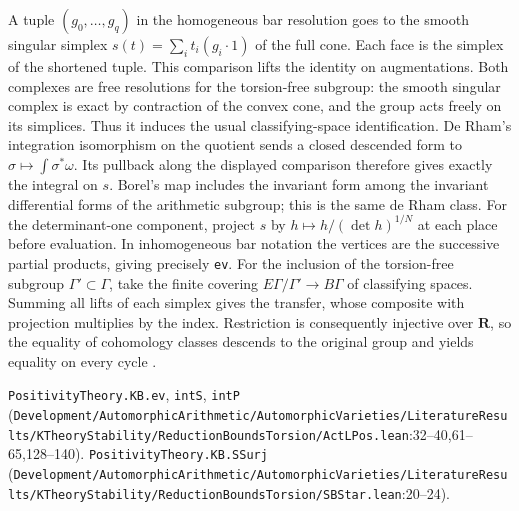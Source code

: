 A tuple $(g_0,\ldots,g_q)$ in the homogeneous bar resolution goes to the smooth singular simplex $s(t)=\sum_i t_i(g_i\cdot1)$ of the full cone. Each face is the simplex of the shortened tuple. This comparison lifts the identity on augmentations. Both complexes are free resolutions for the torsion-free subgroup: the smooth singular complex is exact by contraction of the convex cone, and the group acts freely on its simplices. Thus it induces the usual classifying-space identification. De Rham's integration isomorphism on the quotient sends a closed descended form to $\sigma\mapsto\int\sigma^*\omega$. Its pullback along the displayed comparison therefore gives exactly the integral on $s$. Borel's map includes the invariant form among the invariant differential forms of the arithmetic subgroup; this is the same de Rham class. For the determinant-one component, project $s$ by $h\mapsto h/(\det h)^{1/N}$ at each place before evaluation. In inhomogeneous bar notation the vertices are the successive partial products, giving precisely \nolinkurl{ev}. For the inclusion of the torsion-free subgroup $\Gamma'\subset\Gamma$, take the finite covering $E\Gamma/\Gamma'\to B\Gamma$ of classifying spaces. Summing all lifts of each simplex gives the transfer, whose composite with projection multiplies by the index. Restriction is consequently injective over $\mathbf R$, so the equality of cohomology classes descends to the original group and yields equality on every cycle \cite[Theorem 18.14]{P-R6-Lee-derham}\cite[\S3.G]{P-R6-Hatcher}.
\par{\footnotesize \nolinkurl{PositivityTheory.KB.ev}, \nolinkurl{intS}, \nolinkurl{intP} (\nolinkurl{Development/AutomorphicArithmetic/AutomorphicVarieties/LiteratureResults/KTheoryStability/ReductionBoundsTorsion/ActLPos.lean}\allowbreak:32--40,61--65,128--140). \nolinkurl{PositivityTheory.KB.SSurj} (\nolinkurl{Development/AutomorphicArithmetic/AutomorphicVarieties/LiteratureResults/KTheoryStability/ReductionBoundsTorsion/SBStar.lean}\allowbreak:20--24).\par}

